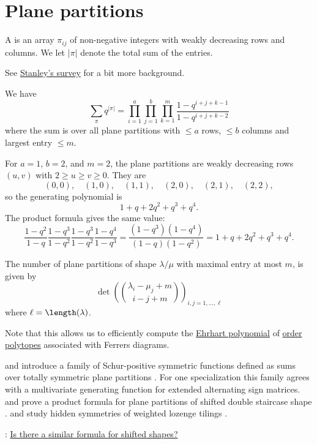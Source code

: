 

\section[planePartitions]{Plane partitions}

A  is an array $\pi_{ij}$ of non-negative 
integers with weakly decreasing rows and columns.
We let $|\pi|$ denote the total sum of the entries.

See \href{http://www-math.mit.edu/~rstan/pubs/pubfiles/75.pdf}{Stanley's survey}
for a bit more background.

\begin{theorem}
We have
\[
\sum_{\pi} q^{|\pi|} = 
\prod_{i=1}^a \prod_{j=1}^b \prod_{k=1}^m
\frac{1-q^{i+j+k-1}}{1-q^{i+j+k-2}}
\]
where the sum is over all plane partitions 
with $\leq a$ rows, $\leq b$ columns and largest entry $\leq m$.
\end{theorem}

\begin{example}
For \(a=1\), \(b=2\), and \(m=2\), the plane partitions are weakly
decreasing rows \((u,v)\) with \(2\geq u\geq v\geq 0\).  They are
\[
  (0,0),\quad (1,0),\quad (1,1),\quad
  (2,0),\quad (2,1),\quad (2,2),
\]
so the generating polynomial is
\[
  1+q+2q^2+q^3+q^4.
\]
The product formula gives the same value:
\[
  \frac{1-q^2}{1-q}
  \frac{1-q^3}{1-q^2}
  \frac{1-q^3}{1-q^2}
  \frac{1-q^4}{1-q^3}
  =
  \frac{(1-q^3)(1-q^4)}{(1-q)(1-q^2)}
  =
  1+q+2q^2+q^3+q^4.
\]
\end{example}


\begin{theorem}
The number of plane partitions of shape $\lambda/\mu$
with maximal entry at most $m$, is given by
\[
\det\left(
\binom{\lambda_i-\mu_j + m}{i-j+m}
\right)_{i,j=1,\dotsc,\ell}
\]
where $\ell = \length(\lambda)$.
\end{theorem}
Note that this allows us to efficiently compute the
\hyperref[ehrhartPolynomialDefinition]{Ehrhart polynomial} of
\hyperref[orderPolytopeDefinition]{order polytopes} associated with Ferrers
diagrams.

 and  introduce a family of
Schur-positive symmetric functions defined as sums over totally symmetric
plane partitions \cite{FischerSchreierAigner2024ASM}.  For one specialization
this family agrees with a multivariate generating function for extended
alternating sign matrices.
 and  prove a product formula for plane
partitions of shifted double staircase shape \cite{HopkinsLai2021}.
 and  study hidden symmetries of weighted
lozenge tilings \cite{PakPetrov2020}.

: \href{https://mathoverflow.net/questions/350445/determinantal-formula-for-plane-partitions-of-shifted-shape}{Is there a similar formula for shifted shapes?}
